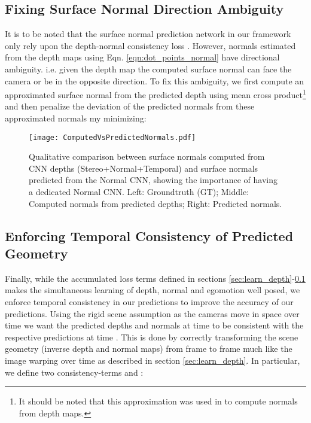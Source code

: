 \documentclass[letterpaper, 10 pt, conference]{ieeeconf}
\begin{document}
\subsection{Fixing Surface Normal Direction Ambiguity}\label{sec:normal_dir}
It is to be noted that the surface normal prediction network in our framework only rely upon the depth-normal consistency loss . However, normals estimated from the depth maps using Eqn. \eqref{eqn:dot_points_normal} have directional ambiguity. i.e. given the depth map the computed surface normal can face the camera or be in the opposite direction. To fix this ambiguity, we  first  compute  an  approximated  surface  normal  from the predicted depth using mean cross product\footnote{It should be noted that this approximation was used in \cite{yang2017depthnormal} to compute normals from depth maps.} and then penalize the deviation of the predicted normals  from these approximated normals my minimizing:









\begin{figure}[t!] 
\centering
\texttt{[image: ComputedVsPredictedNormals.pdf]}
\caption{Qualitative comparison between surface normals computed from CNN depths (Stereo+Normal+Temporal) and surface normals predicted from the Normal CNN, showing the importance of having a dedicated Normal CNN. Left: Groundtruth (GT); Middle: Computed normals from predicted depths; Right: Predicted normals.
\vspace{-5mm}
}
\label{fig:normalComparison}
\end{figure}

\subsection{Enforcing Temporal Consistency of Predicted Geometry} \label{sec:geo_consistency}
Finally, while the accumulated loss terms defined in sections \ref{sec:learn_depth}-\ref{sec:normal_dir} makes the simultaneous learning of depth, normal and egomotion well posed, we enforce temporal consistency in our predictions to improve the accuracy of our predictions. Using the rigid scene assumption as the cameras move in space over time we want the predicted depths and normals at time  to be consistent with the respective predictions at time . This is done by correctly transforming the scene geometry (inverse depth and normal maps) from frame  to frame  much like the image warping over time as described in section \ref{sec:learn_depth}. In particular, we define two consistency-terms  and :
\end{document}
